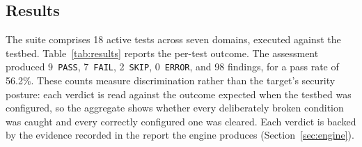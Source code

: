 \subsection{Results}

The suite comprises 18 active tests across seven domains, executed against the testbed.
Table~\ref{tab:results} reports the per-test outcome.
The assessment produced 9~\texttt{PASS}, 7~\texttt{FAIL}, 2~\texttt{SKIP}, 0~\texttt{ERROR}, and 98 findings, for a pass rate of 56.2\%.
These counts measure discrimination rather than the target's security posture: each verdict is read against the outcome expected when the testbed was configured, so the aggregate shows whether every deliberately broken condition was caught and every correctly configured one was cleared. Each verdict is backed by the evidence recorded in the report the engine produces (Section~\ref{sec:engine}).

